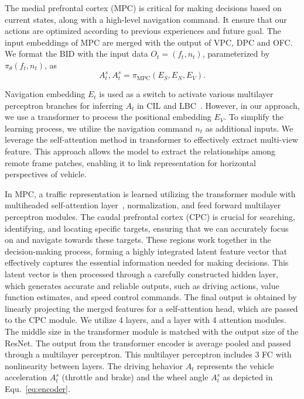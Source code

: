 \documentclass[preprint,12pt]{elsarticle}
\begin{document}
The medial prefrontal cortex (MPC) is critical for making decisions based on current states, along with a high-level navigation command\cite{passingham2012neurobiology}.
It ensure that our actions are optimized according to previous experiences and future goal.
The input embeddings of MPC are merged with the output of VPC, DPC and OFC.
We format the BID with the input data $O_t=(f_t, n_t)$, parameterized by $ \pi_{\theta}(f_t, n_t) $, as
\begin{equation}\label{eq:encoder}
	A_t^s, A_t^s = \pi_\text{MPC}(E_S, E_N, E_V).
\end{equation}


Navigation embedding $E_{t}$ is used as a switch to activate various multilayer perceptron branches for inferring $A_{t}$ in CIL \cite{Codevilla:2018} and LBC~\cite{Codevilla:2019}. 
However, in our approach, we use a transformer to process the positional embedding $ E_V $.
To simplify the learning process, we utilize the navigation command $n_{t}$ as additional inputs.
%
We leverage the self-attention method in transformer to effectively extract multi-view feature\cite{Vaswani:2017}.
This approach allows the model to extract the relationships among remote frame patches, enabling it to link representation for horizontal perspectives of vehicle.


In MPC, a traffic representation is learned utilizing the transformer module with multiheaded self-attention layer~\cite{Vaswani:2017}, normalization, and feed forward multilayer perceptron modules. 
The caudal prefrontal cortex (CPC) is crucial for searching, identifying, and locating specific targets, ensuring that we can accurately focus on and navigate towards these targets\cite{lawler1987role}. 
These regions work together in the decision-making process, forming a highly integrated latent feature vector that effectively captures the essential information needed for making decisions\cite{wardak2004deficit}. 
This latent vector is then processed through a carefully constructed hidden layer, which generates accurate and reliable outputs, such as driving actions, value function estimates, and speed control commands.
The final output is obtained by linearly projecting the merged features for a self-attention head, which are passed to the CPC module.
We utilize 4 layers, and a layer with 4 attention modules. 
The middle size in the transformer module is matched with the output size of the ResNet.
%
The output from the transformer encoder is average pooled and passed through a multilayer perceptron.
This multilayer perceptron includes 3 FC with nonlinearity between layers.
The driving hehavior $A_t$ represents the vehicle acceleration $A_t^s$ (throttle and brake) and the wheel angle $A_t^s$ as depicted in Equ.~\ref{eq:encoder}. 
\end{document}
